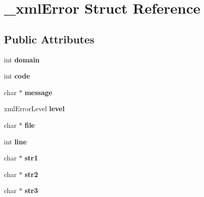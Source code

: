 \hypertarget{struct__xmlError}{
\section{\_\-xmlError Struct Reference}
\label{struct__xmlError}
}
\subsection*{Public Attributes}
\begin{DoxyCompactItemize}
\item 
\hypertarget{struct__xmlError_aab2c2106653999b10a5927fbef170134}{
int {\bfseries domain}}
\label{struct__xmlError_aab2c2106653999b10a5927fbef170134}

\item 
\hypertarget{struct__xmlError_a26d37a9627e5767d10642f7575b456cb}{
int {\bfseries code}}
\label{struct__xmlError_a26d37a9627e5767d10642f7575b456cb}

\item 
\hypertarget{struct__xmlError_aec639995a12899bed05700cf2e12d878}{
char $\ast$ {\bfseries message}}
\label{struct__xmlError_aec639995a12899bed05700cf2e12d878}

\item 
\hypertarget{struct__xmlError_a51d46e073d52e80e09c1968833549dcc}{
xmlErrorLevel {\bfseries level}}
\label{struct__xmlError_a51d46e073d52e80e09c1968833549dcc}

\item 
\hypertarget{struct__xmlError_a26ea8c72d8741e89ae7f7aecf21e3b90}{
char $\ast$ {\bfseries file}}
\label{struct__xmlError_a26ea8c72d8741e89ae7f7aecf21e3b90}

\item 
\hypertarget{struct__xmlError_af25357d13a171f2eeed7b74297d21eb1}{
int {\bfseries line}}
\label{struct__xmlError_af25357d13a171f2eeed7b74297d21eb1}

\item 
\hypertarget{struct__xmlError_a910ea2be7690e0096b321f0b415aad92}{
char $\ast$ {\bfseries str1}}
\label{struct__xmlError_a910ea2be7690e0096b321f0b415aad92}

\item 
\hypertarget{struct__xmlError_ac30b76c554a115afd536016a2867143b}{
char $\ast$ {\bfseries str2}}
\label{struct__xmlError_ac30b76c554a115afd536016a2867143b}

\item 
\hypertarget{struct__xmlError_a8e7da080c0eacf285355e730f00bbf7b}{
char $\ast$ {\bfseries str3}}
\label{struct__xmlError_a8e7da080c0eacf285355e730f00bbf7b}


\end{DoxyCompactItemize}
